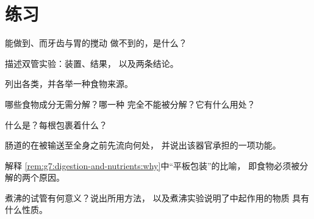\section{练习}

\begin{exercise}[$\star$]\label{exo:g7:digestion-and-nutrients:1}
能做到、而牙齿与胃的搅动
做不到的，是什么？
\end{exercise}

\begin{exercise}[$\star$]\label{exo:g7:digestion-and-nutrients:2}
描述双管实验：装置、结果，
以及两条结论。
\end{exercise}

\begin{exercise}[$\star$]\label{exo:g7:digestion-and-nutrients:3}
列出各类，并各举一种食物来源。
\end{exercise}

\begin{exercise}[$\star$]\label{exo:g7:digestion-and-nutrients:4}
哪些食物成分无需分解？哪一种
完全不能被分解？它有什么用处？
\end{exercise}

\begin{exercise}[$\star$]\label{exo:g7:digestion-and-nutrients:5}
什么是？每根包裹着什么？
\end{exercise}

\begin{exercise}[$\star$]\label{exo:g7:digestion-and-nutrients:6}
肠道的在被输送至全身之前先流向何处，
并说出该器官承担的一项功能。
\end{exercise}

\begin{exercise}[$\star\star$]\label{exo:g7:digestion-and-nutrients:7}
解释
\cref{rem:g7:digestion-and-nutrients:why}中“平板包装”的比喻，
即食物必须被分解的两个原因。
\end{exercise}

\begin{exercise}[$\star\star$]\label{exo:g7:digestion-and-nutrients:8}
煮沸的试管有何意义？说出所用方法，
以及煮沸实验说明了中起作用的物质
具有什么性质。
\end{exercise}

